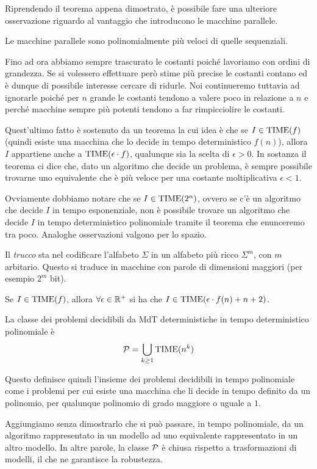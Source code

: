 Riprendendo il teorema appena dimostrato, è possibile fare una
ulteriore osservazione riguardo al vantaggio che introducono le
macchine parallele.

\begin{corollary}
	Le macchine parallele sono polinomialmente più veloci di
	quelle sequenziali.
\end{corollary}

Fino ad ora abbiamo sempre trascurato le costanti poiché
lavoriamo con ordini di grandezza. Se si volessero effettuare
però stime più precise le costanti contano ed è dunque di
possibile interesse cercare di ridurle. Noi continueremo tuttavia
ad ignorarle poiché per $n$ grande le costanti tendono a valere
poco in relazione a $n$ e perché macchine sempre più potenti
tendono a far rimpicciolire le costanti.

Quest'ultimo fatto è sostenuto da un teorema la cui idea è che
se $I \in \TIME (f)$ (quindi esiste una macchina che lo decide
in tempo deterministico $f(n)$), allora $I$ appartiene anche a
$\TIME (\epsilon \cdot f)$, qualunque sia la scelta di
$\epsilon > 0$. In sostanza il teorema ci dice che, dato un
algoritmo che decide un problema, è sempre possibile trovarne
uno equivalente che è più veloce per una costante moltiplicativa
$\epsilon < 1$.

Ovviamente dobbiamo notare che se $I \in \TIME(2^n)$, ovvero se
c'è un algoritmo che decide $I$ in tempo esponenziale, non è
possibile trovare un algoritmo che decide $I$ in tempo
deterministico polinomiale tramite il teorema che enunceremo tra
poco. Analoghe osservazioni valgono per lo spazio.

Il \emph{trucco} sta nel codificare l'alfabeto $\Sigma$ in un
alfabeto più ricco $\Sigma^m$, con $m$ arbitario. Questo si
traduce in macchine con parole di dimensioni maggiori (per
esempio $2^m$ bit).

\begin{theorem}  \label{th: acc_lin}
	Se $I \in \TIME (f)$, allora $\forall \epsilon \in \R^+$ si
	ha che $I \in \TIME(\epsilon \cdot f(n) + n + 2)$.
\end{theorem}

\begin{definition}
	La classe dei problemi decidibili da MdT deterministiche
	in tempo deterministico polinomiale è
	\[ \P = \bigcup_{k \geq 1} \TIME (n^k) \]
\end{definition}

Questo definisce quindi l'insieme dei problemi decidibili in
tempo polinomiale come i problemi per cui esiste una macchina
che li decide in tempo definito da un polinomio, per qualunque
polinomio di grado maggiore o uguale a $1$.

Aggiungiamo senza dimostrarlo che si può passare, in tempo
polinomiale, da un algoritmo rappresentato in un modello ad uno
equivalente rappresentato in un altro modello. In altre parole,
la classe $\P$ è chiusa rispetto a trasformazioni di modelli, il
che ne garantisce la robustezza.
